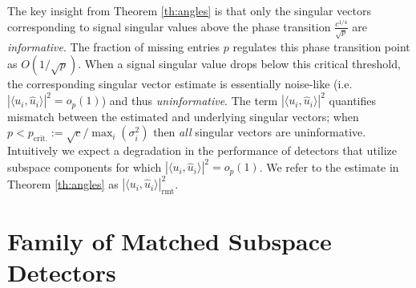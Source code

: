 The key insight from Theorem \ref{th:angles} is that only the singular vectors corresponding to signal singular values above the phase transition $\frac{c^{1/4}}{\sqrt{p}}$ are \textit{informative}. The fraction of missing entries $p$ regulates this phase transition point as $O(1/\sqrt{p})$. When a signal singular value drops below this critical threshold, the corresponding singular vector estimate is essentially noise-like  (i.e. $|\langle u_i,\widehat{u}_i\rangle|^2=o_{p}(1)$) and thus \textit{uninformative}. The term $|\langle u_i,\widehat{u}_i\rangle|^2$ quantifies mismatch between the estimated and underlying singular vectors;  when $p < p_{\text{crit.}} :=\sqrt{c}/\max_{i}(\sigma_{i}^{2})$ then \textit{all} singular vectors are uninformative. Intuitively we expect a degradation in the performance of detectors  that utilize subspace components for which $|\langle u_i,\widehat{u}_i\rangle|^2=o_{p}(1)$.  We refer to the estimate in Theorem \ref{th:angles} as $|\langle u_i,\widehat{u}_i\rangle|^2_{\text{rmt}}$.

\section{Family of Matched Subspace Detectors}\label{sec:derive}

